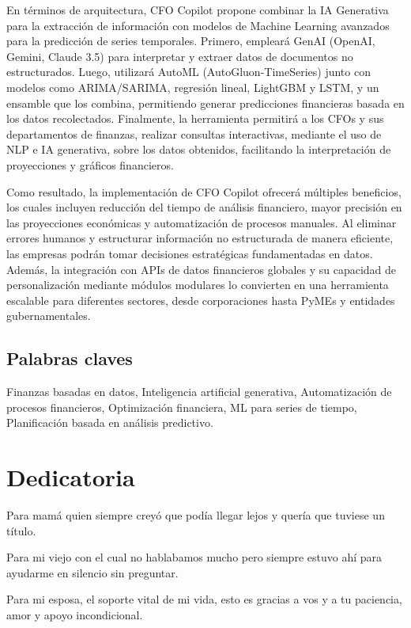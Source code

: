 \documentclass[12pt,letterpaper,oneside]{report}
\renewcommand{\_}{\UnderscoreOriginal\allowbreak}
\begin{document}
En términos de arquitectura, CFO Copilot propone combinar la IA Generativa para la extracción de información con modelos de Machine Learning avanzados para la predicción de series temporales. Primero, empleará GenAI (OpenAI, Gemini, Claude 3.5) para interpretar y extraer datos de documentos no estructurados. Luego, utilizará AutoML (AutoGluon-TimeSeries) junto con modelos como ARIMA/SARIMA, regresión lineal, LightGBM y LSTM, y un ensamble que los combina, permitiendo generar predicciones financieras basada en los datos recolectados. Finalmente, la herramienta permitirá a los CFOs y sus departamentos de finanzas, realizar consultas interactivas, mediante el uso de NLP e IA generativa, sobre los datos obtenidos, facilitando la interpretación de proyecciones y gráficos financieros.

Como resultado, la implementación de CFO Copilot ofrecerá múltiples beneficios, los cuales incluyen reducción del tiempo de análisis financiero, mayor precisión en las proyecciones económicas y automatización de procesos manuales. Al eliminar errores humanos y estructurar información no estructurada de manera eficiente, las empresas podrán tomar decisiones estratégicas fundamentadas en datos. Además, la integración con APIs de datos financieros globales y su capacidad de personalización mediante módulos modulares lo convierten en una herramienta escalable para diferentes sectores, desde corporaciones hasta PyMEs y entidades gubernamentales.

\section*{Palabras claves}
Finanzas basadas en datos, Inteligencia artificial generativa, Automatización de procesos financieros, Optimización financiera, ML para series de tiempo, Planificación basada en análisis predictivo.

\clearpage
\chapter*{Dedicatoria}
\setlength{\parindent}{1.5em}
\indent Para mamá quien siempre creyó que podía llegar lejos y quería que tuviese un título.

\indent Para mi viejo con el cual no hablabamos mucho pero siempre estuvo ahí para ayudarme en silencio sin preguntar.

\indent Para mi esposa, el soporte vital de mi vida, esto es gracias a vos y a tu paciencia, amor y apoyo incondicional.
\end{document}
